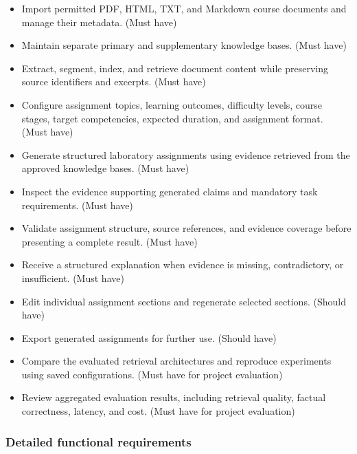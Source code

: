 \documentclass[12pt,a4paper]{article}
\begin{document}
\begin{itemize}
    \item Import permitted PDF, HTML, TXT, and Markdown course
    documents and manage their metadata. (Must have)

    \item Maintain separate primary and supplementary knowledge
    bases. (Must have)

    \item Extract, segment, index, and retrieve document content
    while preserving source identifiers and excerpts. (Must have)

    \item Configure assignment topics, learning outcomes,
    difficulty levels, course stages, target competencies,
    expected duration, and assignment format. (Must have)

    \item Generate structured laboratory assignments using
    evidence retrieved from the approved knowledge bases.
    (Must have)

    \item Inspect the evidence supporting generated claims and
    mandatory task requirements. (Must have)

    \item Validate assignment structure, source references,
    and evidence coverage before presenting a complete result.
    (Must have)

    \item Receive a structured explanation when evidence is
    missing, contradictory, or insufficient. (Must have)

    \item Edit individual assignment sections and regenerate
    selected sections. (Should have)

    \item Export generated assignments for further use.
    (Should have)

    \item Compare the evaluated retrieval architectures and
    reproduce experiments using saved configurations.
    (Must have for project evaluation)

    \item Review aggregated evaluation results, including
    retrieval quality, factual correctness, latency, and cost.
    (Must have for project evaluation)
\end{itemize}

\subsubsection*{Detailed functional requirements}
\end{document}
